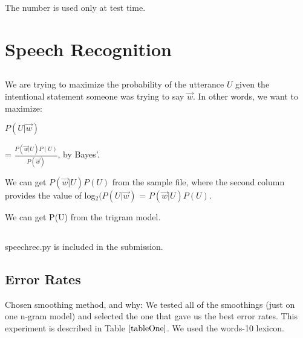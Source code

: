 \documentclass[12pt, letterpaper]{article}
\begin{document}
The number is used only at test time.

\section{Speech Recognition}
\subsection{}


We are trying to maximize the probability of the utterance $U$ given the intentional statement someone was trying to say $\overrightarrow{w}$. In other words, we want to maximize: 

$P(U|\overrightarrow{w})$

= $\frac{P(\overrightarrow{w}|U) P(U)}{P(\overrightarrow{w})}$, by Bayes'.

We can get $P(\overrightarrow{w}|U) P(U)$ from the sample file, where the second column provides the value of log$_{2}(P(U|\overrightarrow{w})$ = $P(\overrightarrow{w}|U) P(U)$.

We can get P(U) from the trigram model. 

\subsection{}
speechrec.py is included in the submission.

\subsection{Error Rates}

Chosen smoothing method, and why: We tested all of the smoothings (just on one n-gram model) and selected the one that gave us the best error rates. This experiment is described in Table $\ref{tableOne}$. We used the words-10 lexicon.
\end{document}
